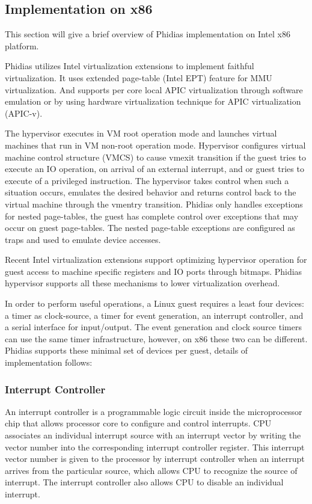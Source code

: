 \subsection{Implementation on x86}
This section will give a brief overview of Phidias implementation on Intel x86 platform.

Phidias utilizes Intel virtualization extensions to implement faithful virtualization. 
It uses extended page-table (Intel EPT) feature for MMU virtualization. 
And supports per core local APIC virtualization through software
emulation or by using hardware virtualization technique for APIC virtualization (APIC-v).

The hypervisor executes in VM root operation mode and launches virtual machines that run in VM non-root operation mode.
Hypervisor configures virtual machine control structure (VMCS) to cause vmexit transition if the guest tries to execute an IO operation, on arrival of an external interrupt, and or guest tries to execute of a privileged instruction.  
The hypervisor takes control when such a situation occurs, emulates the desired behavior and returns control back to the virtual machine through the vmentry transition. 
Phidias only handles exceptions for nested page-tables, the guest has complete control over exceptions that may occur on guest page-tables.
The nested page-table exceptions are configured as traps and used to emulate device accesses. 

Recent Intel virtualization extensions support optimizing hypervisor operation for guest access to machine specific registers and IO ports through bitmaps.
Phidias hypervisor supports all these mechanisms to lower virtualization overhead. 

In order to perform useful operations, a Linux guest requires a least four devices: a timer as clock-source, a timer for event generation, an interrupt controller, and a serial interface for input/output. The event generation and clock source timers can use the same timer infrastructure, however, on x86 these two can be different. Phidias supports these minimal set of devices per guest, details of implementation follows:

\subsubsection{Interrupt Controller}
An interrupt controller is a programmable logic circuit inside the microprocessor chip that allows processor core to configure and control interrupts.
CPU associates an individual interrupt source with an interrupt vector by writing the vector number into the corresponding interrupt controller register.
This interrupt vector number is given to the processor by interrupt controller when an interrupt arrives from the particular source, which allows CPU to
recognize the source of interrupt. The interrupt controller also allows CPU to disable an individual interrupt.


